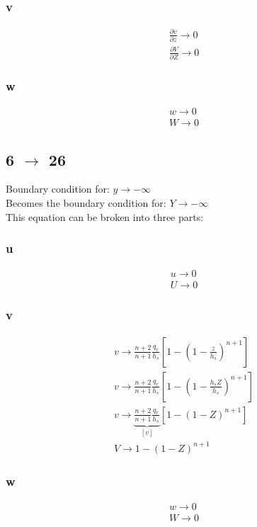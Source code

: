 \documentclass[10pt, letterpaper, twoside]{article}
\newcommand{\pd}[2]{\frac{\partial#1}{\partial#2}}
\begin{document}
	\subsubsection{v}
	\begin{gather*}
		\pd{v}{z} \rightarrow 0 \tag{5b} \\
		\pd{V}{Z} \rightarrow 0 \tag{25b}
	\end{gather*}
	\subsubsection{w}
	\begin{gather*}
		w \rightarrow 0 \tag{5c} \\
		W \rightarrow 0 \tag{25c}
	\end{gather*}
	\subsection{6 $ \rightarrow $ 26}
	Boundary condition for: $ y\rightarrow-\infty $\\
	Becomes the boundary condition for: $ Y\rightarrow-\infty$\\
	This equation can be broken into three parts:
	\subsubsection{u}
	\begin{gather*}
		u \rightarrow 0 \tag{6a} \\
		U \rightarrow 0 \tag{26a}
	\end{gather*}
	\subsubsection{v}
	\begin{gather*}
		v \rightarrow \frac{n+2}{n+1}\frac{q_r}{h_s}\left[1-\left(1-\frac{z}{h_s}\right)^{n+1}\right] \tag{6b} \\
		v \rightarrow \frac{n+2}{n+1}\frac{q_r}{h_s}\left[1-\left(1-\frac{h_sZ}{h_s}\right)^{n+1}\right]\\
		v \rightarrow \underset{\left[v\right]}{\underbrace{\frac{n+2}{n+1}\frac{q_r}{h_s}}}\left[1-\left(1-Z\right)^{n+1}\right]\\
		V \rightarrow 1-\left(1-Z\right)^{n+1} \tag{26b}
	\end{gather*}
	\subsubsection{w}
	\begin{gather*}
		w \rightarrow 0 \tag{6c} \\
		W \rightarrow 0 \tag{26c}
	\end{gather*}
\end{document}
